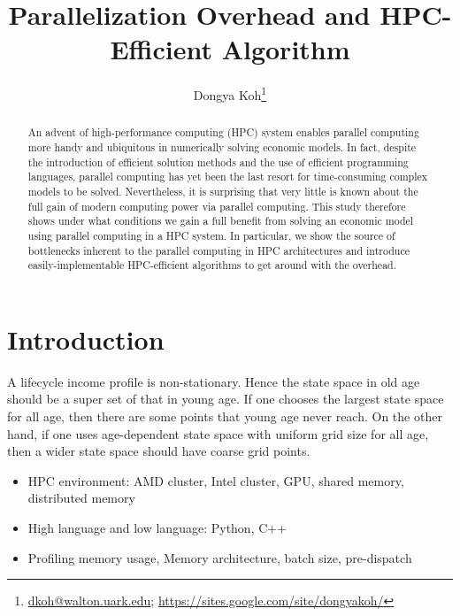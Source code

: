 \documentclass[12pt]{article}
\begin{document}
\sf

\title{\textbf{Parallelization Overhead and HPC-Efficient Algorithm}}
\author{Dongya Koh\thanks{\href{mailto:dkoh@walton.uark.edu}{dkoh@walton.uark.edu}; \url{https://sites.google.com/site/dongyakoh/}}}
\maketitle


\begin{abstract}
An advent of high-performance computing (HPC) system enables parallel computing more handy and ubiquitous in numerically solving economic models. In fact, despite the introduction of efficient solution methods and the use of efficient programming languages, parallel computing has yet been the last resort for time-consuming complex models to be solved. Nevertheless, it is surprising that very little is known about the full gain of modern computing power via parallel computing. This study therefore shows under what conditions we gain a full benefit from solving an economic model using parallel computing in a HPC system. In particular, we show the source of bottlenecks inherent to the parallel computing in HPC architectures and introduce easily-implementable HPC-efficient algorithms to get around with the overhead.
\end{abstract}


\newpage
\section{Introduction}

A lifecycle income profile is non-stationary. Hence the state space in old age should be a super set of that in young age. If one chooses the largest state space for all age, then there are some points that young age never reach. On the other hand, if one uses age-dependent state space with uniform grid size for all age, then a wider state space should have coarse grid points.

\begin{itemize}
\item HPC environment: AMD cluster, Intel cluster, GPU, shared memory, distributed memory
\item High language and low language: Python, C++
\item Profiling memory usage, Memory architecture, batch size, pre-dispatch
\end{itemize}
\end{document}
